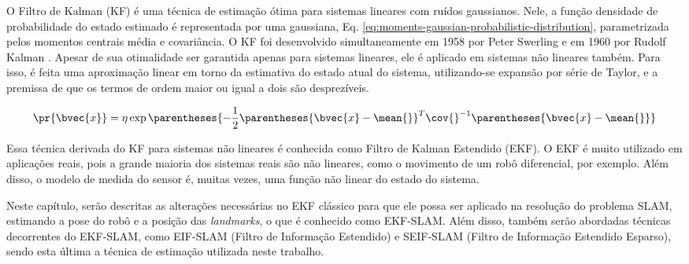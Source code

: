 O Filtro de Kalman (KF) é uma técnica de estimação ótima para sistemas lineares com ruídos gaussianos. Nele, a função densidade de probabilidade do estado estimado é representada por uma gaussiana, 
Eq. \ref{eq:moments-gaussian-probabilistic-distribution}, parametrizada pelos momentos centrais média e covariância. O KF foi desenvolvido simultaneamente em 1958 por Peter Swerling e em 1960 por Rudolf Kalman \cite[p.~40]{bongard2006probabilistic}. Apesar de sua otimalidade ser garantida apenas para sistemas lineares, ele é aplicado em sistemas não lineares também. Para isso, é feita uma aproximação linear em torno da estimativa do estado atual do sistema, utilizando-se expansão por série de Taylor, e a premissa de que os termos de ordem maior ou igual a dois são desprezíveis.

\begin{equation}
  \pr{\bvec{x}} = \eta \exp\parentheses{-\frac{1}{2} 
  \parentheses{\bvec{x} - \mean{}}^T \cov{}^{-1}\parentheses{\bvec{x} - \mean{}}}
  \label{eq:moments-gaussian-probabilistic-distribution}
\end{equation}

Essa técnica derivada do KF para sistemas não lineares é conhecida como Filtro de Kalman Estendido (EKF). O EKF é muito utilizado em aplicações reais, pois a grande maioria dos sistemas reais são não lineares, como o movimento de um robô diferencial, por exemplo. Além disso, o modelo de medida do sensor é, muitas vezes, uma função não linear do estado do sistema.

Neste capítulo, serão descritas as alterações necessárias no EKF clássico para que ele possa ser aplicado na resolução do problema SLAM, estimando a pose do robô e a posição das \textit{landmarks}, o que é conhecido como EKF-SLAM. Além disso, também serão abordadas técnicas decorrentes do EKF-SLAM, como EIF-SLAM (Filtro de Informação Estendido) e SEIF-SLAM (Filtro de Informação Estendido Esparso), sendo esta última a técnica de estimação utilizada neste trabalho.

